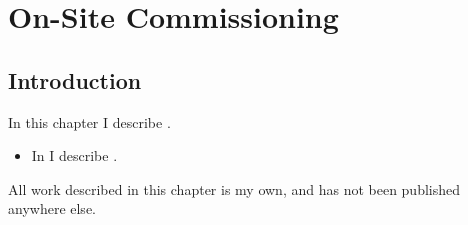 \chapter{On-Site Commissioning}
\label{chap:commissioning}
\chaptoc{}


\newpage
\section{Introduction}
\label{sec:commissioning_intro}
\begin{colsection}

In this chapter I describe .
%
\begin{itemize}
    \item In  I describe .
\end{itemize}
%
All work described in this chapter is my own, and has not been published anywhere else.

\end{colsection}


\newpage

